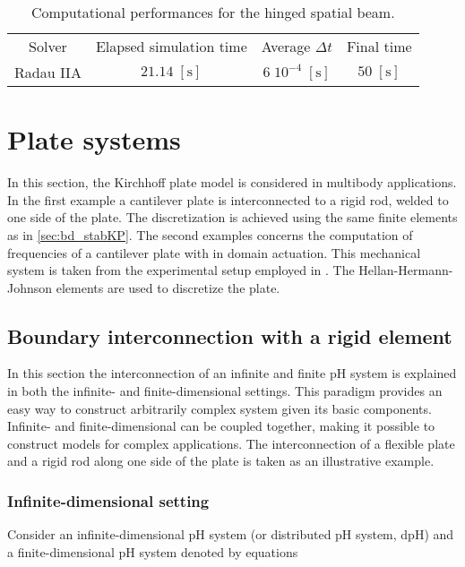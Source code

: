 \begin{table}[tb]
	\centering
	\caption{Computational performances for the hinged spatial beam.}
	\label{tab:comp_perf_hinged}       %
	\begin{tabular}{cccc}
		\hline\noalign{\smallskip}
		Solver & Elapsed simulation time & Average $\Delta t$ &  Final time \\
		\noalign{\smallskip}\hline\noalign{\smallskip}
		Radau IIA & $21.14\; \mathrm{[s]}$ & $6 \; 10^{-4} \; \mathrm{[s]}$ & $50 \; \mathrm{[s]}$ \\
		\hline
	\end{tabular}
\end{table}


\section{Plate systems}
In this section, the Kirchhoff plate model is considered in multibody applications. In the first example a cantilever plate is interconnected to a rigid rod, welded to one side of the plate. The discretization is achieved using the same finite elements as in \ref{sec:bd_stabKP}. The second examples concerns the computation of frequencies of a cantilever plate with in domain actuation. This mechanical system is taken from the experimental setup employed in \cite{preda2020}. The Hellan-Hermann-Johnson elements are used to discretize the plate.

\subsection{Boundary interconnection with a rigid element}
In this section the interconnection of an infinite and finite pH system is explained in both the infinite- and finite-dimensional settings. This paradigm provides an easy way to construct arbitrarily complex system given its basic components. Infinite- and finite-dimensional can be coupled together, making it possible to construct models for complex applications. The interconnection of a flexible plate and a rigid rod along one side of the plate is taken as an illustrative example.

\subsubsection{Infinite-dimensional setting}
Consider an infinite-dimensional pH system (or distributed pH system, dpH) and a finite-dimensional pH system denoted by equations 

